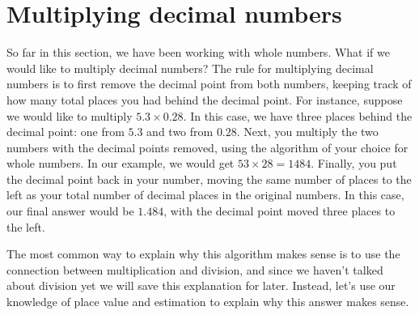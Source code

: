 \documentclass{ximera}
\begin{document}
\section{Multiplying decimal numbers}

So far in this section, we have been working with whole numbers. What if we would like to multiply decimal numbers? The rule for multiplying decimal numbers is to first remove the decimal point from both numbers, keeping track of how many total places you had behind the decimal point. For instance, suppose we would like to multiply $5.3 \times 0.28$. In this case, we have three places behind the decimal point: one from $5.3$ and two from $0.28$. Next, you multiply the two numbers with the decimal points removed, using the algorithm of your choice for whole numbers. In our example, we would get $53 \times 28 = 1484$. Finally, you put the decimal point back in your number, moving the same number of places to the left as your total number of decimal places in the original numbers. In this case, our final answer would be $1.484$, with the decimal point moved three places to the left. 

The most common way to explain why this algorithm makes sense is to use the connection between multiplication and division, and since we haven't talked about division yet we will save this explanation for later. Instead, let's use our knowledge of place value and estimation to explain why this answer makes sense.
\end{document}
